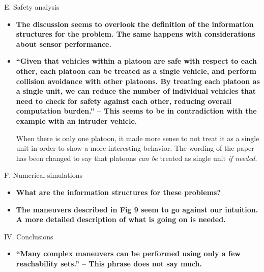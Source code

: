 \documentclass[submit]{aiaa-pretty}
\begin{document}
E. Safety analysis
\begin{itemize}
\item \textbf{The discussion seems to overlook the definition of the information structures for the problem. The same happens with considerations about sensor performance.}
\item \textbf{``Given that vehicles within a platoon are safe with respect to each other, each platoon can be treated as a single vehicle, and perform collision avoidance with other platoons. By treating each platoon as a single unit, we can reduce the number of individual vehicles that need to check for safety against each other, reducing overall computation burden.'' – This seems to be in contradiction with the example with an intruder vehicle.}

When there is only one platoon, it made more sense to not treat it as a single unit in order to show a more interesting behavior. The wording of the paper has been changed to say that platoons \textit{can be} treated as single unit \textit{if needed}.
\end{itemize}

F. Numerical simulations
\begin{itemize}
\item \textbf{What are the information structures for these problems?}
\item \textbf{The maneuvers described in Fig 9 seem to go against our intuition. A more detailed description of what is going on is needed.}
\end{itemize}

IV. Conclusions
\begin{itemize}
\item \textbf{``Many complex maneuvers can be performed using only a few reachability sets.'' – This phrase does not say much.}
\end{itemize}
\end{document}
